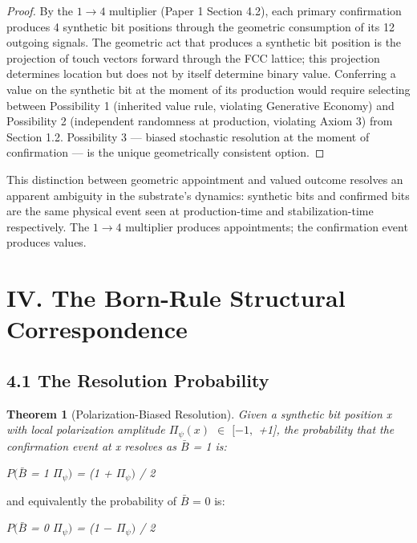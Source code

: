 \documentclass[11pt,oneside]{report}
\newtheorem{theorem}{Theorem}[section]
\theoremstyle{definition}
\theoremstyle{remark}
\begin{document}
\begin{proof}
By the \ensuremath{1\to 4} multiplier (Paper 1 Section 4.2), each primary
confirmation produces 4 synthetic bit positions through the geometric
consumption of its 12 outgoing signals. The geometric act that produces
a synthetic bit position is the projection of touch vectors forward
through the FCC lattice; this projection determines location but does
not by itself determine binary value. Conferring a value on the
synthetic bit at the moment of its production would require selecting
between Possibility 1 (inherited value rule, violating Generative
Economy) and Possibility 2 (independent randomness at production,
violating Axiom 3) from Section 1.2. Possibility 3 --- biased stochastic
resolution at the moment of confirmation --- is the unique geometrically
consistent option.

\end{proof}

This distinction between geometric appointment and valued outcome
resolves an apparent ambiguity in the substrate's dynamics: synthetic
bits and confirmed bits are the same physical event seen at
production-time and stabilization-time respectively. The \ensuremath{1\to 4} multiplier
produces appointments; the confirmation event produces values.

\section*{IV. The Born-Rule Structural Correspondence}

\subsection*{4.1 The Resolution Probability}

\begin{theorem}[Polarization-Biased Resolution]
Given a synthetic bit position
x with local polarization amplitude \ensuremath{\Pi_{\psi}(x)} \ensuremath{\in} \ensuremath{[-1,} +1], the
probability that the confirmation event at x resolves as \ensuremath{\bar{B}} = 1 is:
\end{theorem}

\emph{\ensuremath{P(\bar{B}} = 1 \textbar{} \ensuremath{\Pi_{\psi})} = (1 + \ensuremath{\Pi_{\psi})} / 2}

and equivalently the probability of \ensuremath{\bar{B}} = 0 is:

\emph{\ensuremath{P(\bar{B}} = 0 \textbar{} \ensuremath{\Pi_{\psi})} = (1 \ensuremath{-} \ensuremath{\Pi_{\psi})} / 2}
\end{document}
